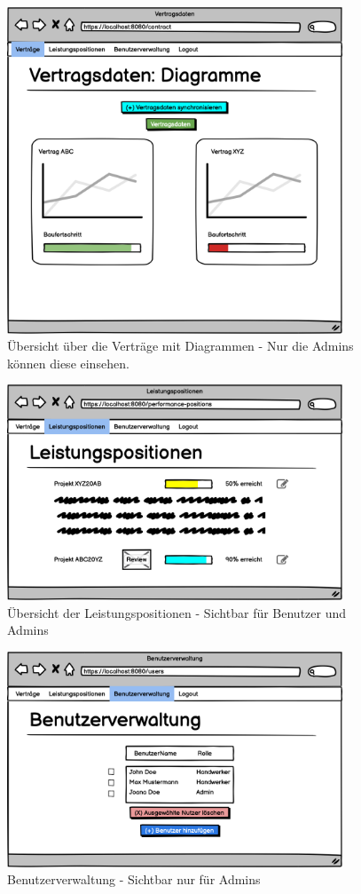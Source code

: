 \begin{figure}[h]
\centering
\includegraphics[width=10cm]{img/mockup_web/admin-vertraage-diagramme.png}
\caption{Übersicht über die Verträge mit Diagrammen - Nur die Admins können diese einsehen.}
\end{figure}

\begin{figure}[h]
\centering
\includegraphics[width=10cm]{img/mockup_web/admin-und-benutzer-leistungspositionen.png}
\caption{Übersicht der Leistungspositionen - Sichtbar für Benutzer und Admins}
\end{figure}

\begin{figure}[h]
\centering
\includegraphics[width=10cm]{img/mockup_web/admin-benutzerverwaltung.png}
\caption{Benutzerverwaltung - Sichtbar nur für Admins}
\end{figure}

